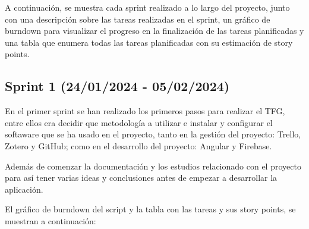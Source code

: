 A continuación, se muestra cada sprint realizado a lo largo del proyecto, junto con una descripción sobre las tareas realizadas en el sprint, un gráfico de burndown para visualizar el progreso en la finalización de las tareas planificadas y una tabla que enumera todas las tareas planificadas con su estimación de story points.

\hfill

\subsection{Sprint 1 (24/01/2024 - 05/02/2024)}
En el primer sprint se han realizado los primeros pasos para realizar el TFG, entre ellos era decidir que metodología a utilizar e instalar y configurar el softaware que se ha usado en el proyecto, tanto en la gestión del proyecto: Trello, Zotero y GitHub; como en el desarrollo del proyecto: Angular y Firebase.

Además de comenzar la documentación y los estudios relacionado con el proyecto para así tener varias ideas y conclusiones antes de empezar a desarrollar la aplicación.

El gráfico de burndown del script y la tabla con las tareas y sus story points, se muestran a continuación:

\hfill


\hfill

